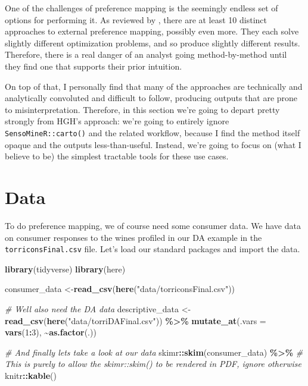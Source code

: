 \documentclass[
]{book}
\newenvironment{Shaded}{\begin{snugshade}}{\end{snugshade}}
\newcommand{\AttributeTok}[1]{\textcolor[rgb]{0.13,0.29,0.53}{#1}}
\newcommand{\CommentTok}[1]{\textcolor[rgb]{0.56,0.35,0.01}{\textit{#1}}}
\newcommand{\DecValTok}[1]{\textcolor[rgb]{0.00,0.00,0.81}{#1}}
\newcommand{\FunctionTok}[1]{\textcolor[rgb]{0.13,0.29,0.53}{\textbf{#1}}}
\newcommand{\NormalTok}[1]{#1}
\newcommand{\OtherTok}[1]{\textcolor[rgb]{0.56,0.35,0.01}{#1}}
\newcommand{\SpecialCharTok}[1]{\textcolor[rgb]{0.81,0.36,0.00}{\textbf{#1}}}
\newcommand{\StringTok}[1]{\textcolor[rgb]{0.31,0.60,0.02}{#1}}
\begin{document}
One of the challenges of preference mapping is the seemingly endless set of options for performing it. As reviewed by \citet{yenketCOMPARISON2011}, there are at least 10 distinct approaches to external preference mapping, possibly even more. They each solve slightly different optimization problems, and so produce slightly different results. Therefore, there is a real danger of an analyst going method-by-method until they find one that supports their prior intuition.

On top of that, I personally find that many of the approaches are technically and analytically convoluted and difficult to follow, producing outputs that are prone to misinterpretation. Therefore, in this section we're going to depart pretty strongly from HGH's approach: we're going to entirely ignore \texttt{SensoMineR::carto()} and the related workflow, because I find the method itself opaque and the outputs less-than-useful. Instead, we're going to focus on (what I believe to be) the simplest tractable tools for these use cases.

\section{Data}\label{data}

To do preference mapping, we of course need some consumer data. We have data on consumer responses to the wines profiled in our DA example in the \texttt{torriconsFinal.csv} file. Let's load our standard packages and import the data.

\begin{Shaded}
\begin{Highlighting}[]
\FunctionTok{library}\NormalTok{(tidyverse)}
\FunctionTok{library}\NormalTok{(here)}

\NormalTok{consumer\_data }\OtherTok{\textless{}{-}}\FunctionTok{read\_csv}\NormalTok{(}\FunctionTok{here}\NormalTok{(}\StringTok{"data/torriconsFinal.csv"}\NormalTok{))}

\CommentTok{\# We\textquotesingle{}ll also need the DA data}
\NormalTok{descriptive\_data }\OtherTok{\textless{}{-}} \FunctionTok{read\_csv}\NormalTok{(}\FunctionTok{here}\NormalTok{(}\StringTok{"data/torriDAFinal.csv"}\NormalTok{)) }\SpecialCharTok{\%\textgreater{}\%}
  \FunctionTok{mutate\_at}\NormalTok{(}\AttributeTok{.vars =} \FunctionTok{vars}\NormalTok{(}\DecValTok{1}\SpecialCharTok{:}\DecValTok{3}\NormalTok{), }\SpecialCharTok{\textasciitilde{}}\FunctionTok{as.factor}\NormalTok{(.))}

\CommentTok{\# And finally let\textquotesingle{}s take a look at our data}
\NormalTok{skimr}\SpecialCharTok{::}\FunctionTok{skim}\NormalTok{(consumer\_data) }\SpecialCharTok{\%\textgreater{}\%} 
  \CommentTok{\# This is purely to allow the skimr::skim() to be rendered in PDF, ignore otherwise}
\NormalTok{  knitr}\SpecialCharTok{::}\FunctionTok{kable}\NormalTok{()}
\end{Highlighting}
\end{Shaded}
\end{document}
